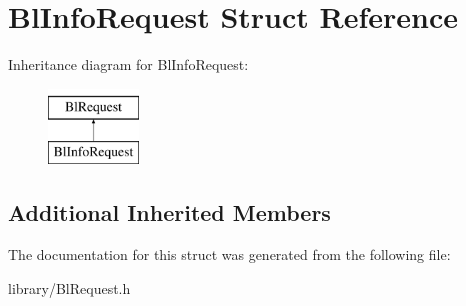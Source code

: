 \hypertarget{struct_bl_info_request}{\section{Bl\-Info\-Request Struct Reference}
\label{struct_bl_info_request}
}
Inheritance diagram for Bl\-Info\-Request\-:\begin{figure}[H]
\begin{center}
\leavevmode
\includegraphics[height=2.000000cm]{struct_bl_info_request}
\end{center}
\end{figure}
\subsection*{Additional Inherited Members}


The documentation for this struct was generated from the following file\-:\begin{DoxyCompactItemize}
\item 
library/Bl\-Request.\-h\end{DoxyCompactItemize}
